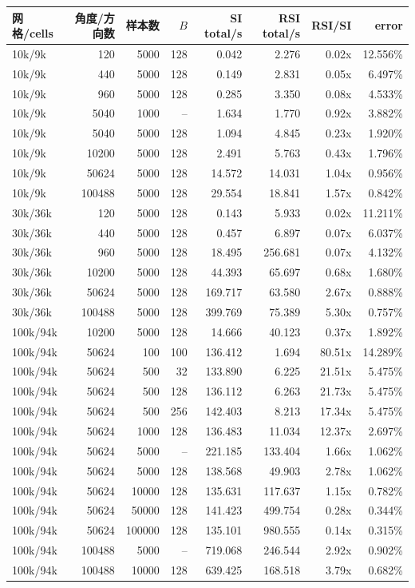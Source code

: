 \documentclass[10pt]{article}
\begin{document}
{\scriptsize\setlength{\tabcolsep}{3pt}
\begin{tabular}{lrrrrrrr}
\toprule
网格/cells & 角度/方向数 & 样本数 & $B$ & SI total/s & RSI total/s & RSI/SI & error\\
\midrule
10k/9k&120&5000&128&0.042&2.276&0.02x&12.556\%\\
10k/9k&440&5000&128&0.149&2.831&0.05x&6.497\%\\
10k/9k&960&5000&128&0.285&3.350&0.08x&4.533\%\\
10k/9k&5040&1000&--&1.634&1.770&0.92x&3.882\%\\
10k/9k&5040&5000&128&1.094&4.845&0.23x&1.920\%\\
10k/9k&10200&5000&128&2.491&5.763&0.43x&1.796\%\\
10k/9k&50624&5000&128&14.572&14.031&1.04x&0.956\%\\
10k/9k&100488&5000&128&29.554&18.841&1.57x&0.842\%\\
30k/36k&120&5000&128&0.143&5.933&0.02x&11.211\%\\
30k/36k&440&5000&128&0.457&6.897&0.07x&6.037\%\\
30k/36k&960&5000&128&18.495&256.681&0.07x&4.132\%\\
30k/36k&10200&5000&128&44.393&65.697&0.68x&1.680\%\\
30k/36k&50624&5000&128&169.717&63.580&2.67x&0.888\%\\
30k/36k&100488&5000&128&399.769&75.389&5.30x&0.757\%\\
100k/94k&10200&5000&128&14.666&40.123&0.37x&1.892\%\\
100k/94k&50624&100&100&136.412&1.694&80.51x&14.289\%\\
100k/94k&50624&500&32&133.890&6.225&21.51x&5.475\%\\
100k/94k&50624&500&128&136.112&6.263&21.73x&5.475\%\\
100k/94k&50624&500&256&142.403&8.213&17.34x&5.475\%\\
100k/94k&50624&1000&128&136.483&11.034&12.37x&2.697\%\\
100k/94k&50624&5000&--&221.185&133.404&1.66x&1.062\%\\
100k/94k&50624&5000&128&138.568&49.903&2.78x&1.062\%\\
100k/94k&50624&10000&128&135.631&117.637&1.15x&0.782\%\\
100k/94k&50624&50000&128&141.423&499.754&0.28x&0.344\%\\
100k/94k&50624&100000&128&135.101&980.555&0.14x&0.315\%\\
100k/94k&100488&5000&--&719.068&246.544&2.92x&0.902\%\\
100k/94k&100488&10000&128&639.425&168.518&3.79x&0.682\%\\
\bottomrule
\end{tabular}}
\end{document}
